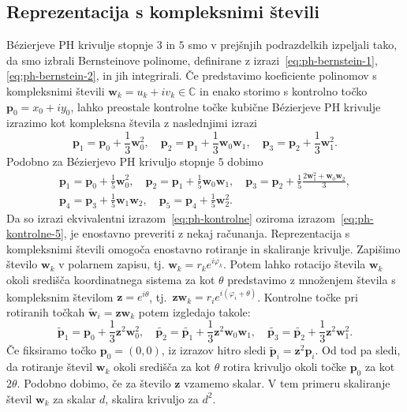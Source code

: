 \documentclass[isrm2, tisk]{fmfdelo}
\newcommand{\C}{\mathbb C}
\newcommand{\p}{\mathbf{p}}
\begin{document}
    \subsection{Reprezentacija s kompleksnimi števili}\label{subsec:complex-repr}
    Bézierjeve PH krivulje stopnje $3$ in $5$ smo v prejšnjih podrazdelkih izpeljali tako, da smo izbrali Bernsteinove polinome, definirane z izrazi~\eqref{eq:ph-bernstein-1},\eqref{eq:ph-bernstein-2}, in jih integrirali.
    Če predstavimo koeficiente polinomov s kompleksnimi števili $\mathbf{w}_k = u_k + iv_k\in \C$ in enako storimo s kontrolno točko $\p_0=x_0 + iy_0$, lahko preostale kontrolne točke kubične Bézierjeve PH krivulje izrazimo kot kompleksna števila z naslednjimi izrazi
    \[\p_1=\p_0+\frac{1}{3}\mathbf{w}_0^2,\quad \p_2=\p_1+\frac{1}{3}\mathbf{w}_0\mathbf{w}_1,\quad \p_3=\p_2+\frac{1}{3}\mathbf{w}_1^2.\]
    Podobno za Bézierjevo PH krivuljo stopnje $5$ dobimo
    \begin{gather*}
        \p_1=\p_0+\frac{1}{5}\mathbf{w}_0^2,\quad \p_2=\p_1 +\frac{1}{5}\mathbf{w}_0\mathbf{w}_1,\quad  \p_3=\p_2+\frac{1}{5} \frac{2\mathbf{w}_1^2 + \mathbf{w}_0\mathbf{w}_2}{3}, \\
        \p_4=\p_3+\frac{1}{5}\mathbf{w}_1\mathbf{w}_2,\quad \p_5=\p_4+\frac{1}{5}\mathbf{w}_2^2.
    \end{gather*}
    Da so izrazi ekvivalentni izrazom~\eqref{eq:ph-kontrolne} oziroma izrazom~\eqref{eq:ph-kontrolne-5}, je enostavno preveriti z nekaj računanja.
    Reprezentacija s kompleksnimi števili omogoča enostavno rotiranje in skaliranje krivulje.
    Zapišimo število $\mathbf{w}_k$ v polarnem zapisu, tj. $\mathbf{w}_k=r_k e^{i\varphi_k}$.
    Potem lahko rotacijo števila $\mathbf{w}_k$ okoli središča koordinatnega sistema za kot $\theta$ predstavimo z množenjem števila s kompleksnim številom $\mathbf{z}=e^{i\theta}$, tj.\ $\mathbf{z}\mathbf{w}_k=r_i e^{i(\varphi_i+\theta)}$.
    Kontrolne točke pri rotiranih točkah $\mathbf{\tilde{w}}_i=\mathbf{z}\mathbf{w}_k$ potem izgledajo takole:
    \[\tilde{\p}_1=\p_0+\frac{1}{3}\mathbf{z}^2\mathbf{w}_0^2,\quad \tilde{\p_2}=\tilde{\p_1}+\frac{1}{3}\mathbf{z}^2\mathbf{w}_0\mathbf{w}_1,\quad \tilde{\p_3}=\tilde{\p_2}+\frac{1}{3}\mathbf{z}^2\mathbf{w}_1^2.\]
    Če fiksiramo točko $\p_0=(0,0)$, iz izrazov hitro sledi $\tilde{\p}_i=\mathbf{z}^2\p_i$.
    Od tod pa sledi, da rotiranje števil $\mathbf{w}_k$ okoli središča za kot $\theta$ rotira krivuljo okoli točke $\p_0$ za kot $2\theta$.
    Podobno dobimo, če za število $\mathbf{z}$ vzamemo skalar.
    V tem primeru skaliranje števil $\mathbf{w}_k$ za skalar $d$, skalira krivuljo za $d^2$.
\end{document}
